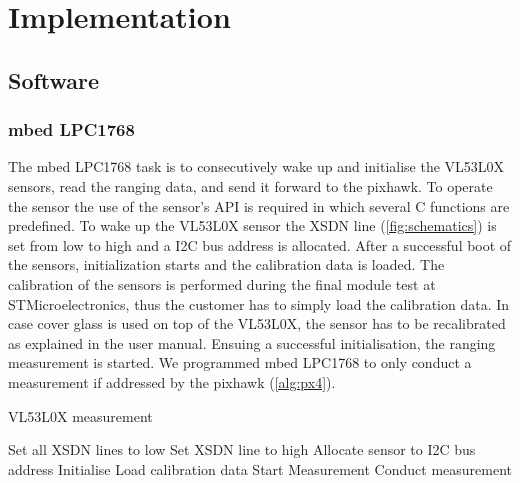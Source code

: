 \chapter{Implementation}
\label{ch:implementation}

\section{Software}
\subsection{mbed LPC1768}
\label{subs:mbed}
The mbed LPC1768 task is to consecutively wake up and initialise the VL53L0X sensors, read the ranging data, and send it forward to the pixhawk. To operate the sensor the use of the sensor's API is required in which several C functions are predefined. To wake up the VL53L0X sensor the XSDN line (\cref{fig:schematics}) is set from low to high and a I2C bus address is allocated. After a successful boot of the sensors, initialization starts and the calibration data is loaded. The calibration of the sensors is performed during the final module test at STMicroelectronics, thus the customer has to simply load the calibration data. In case cover glass is used on top of the VL53L0X, the sensor has to be recalibrated as explained in the user manual. Ensuing a successful initialisation, the ranging measurement is started. We programmed mbed LPC1768 to only conduct a measurement if addressed by the pixhawk (\cref{alg:px4}). 

\begin{algorithm}
	\caption{VL53L0X measurement}\label{alg:px4}
	\begin{algorithmic}[1]
		\State Set all XSDN lines to low
		\State Set XSDN line to high
		\State Allocate sensor to I2C bus address
		\EndFor
		\State Initialise 
		\State Load calibration data
		\EndFor
		\State Start Measurement
		\State Conduct measurement
		\EndIf
		\EndFor
		\EndProcedure
	\end{algorithmic}
\end{algorithm}

